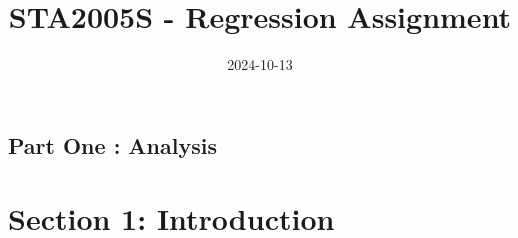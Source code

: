 \documentclass[12pt,halfline,a4paper,]{ouparticle}
\begin{document}
\title{STA2005S - Regression Assignment}

\author{%
%
%
%
%
%
%
%
%
%
\and
{}
%
%
%
%
%
%
}

\abstract{}

\date{2024-10-13}

\keywords{}

\maketitle



\newpage

\hypertarget{part-one-analysis}{%
\subsection{Part One : Analysis}\label{part-one-analysis}}

\hypertarget{section-1-introduction}{%
\section{Section 1: Introduction}\label{section-1-introduction}}
\end{document}
